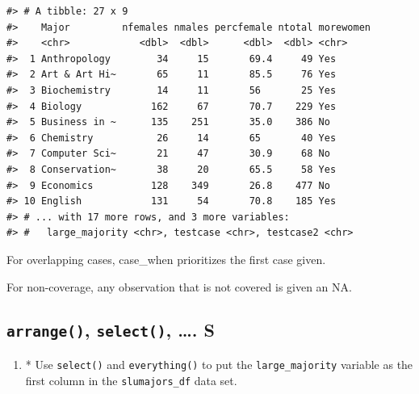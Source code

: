 \documentclass[
]{book}
\providecommand{\tightlist}{%
  \setlength{\itemsep}{0pt}\setlength{\parskip}{0pt}}
\begin{document}
\begin{verbatim}
#> # A tibble: 27 x 9
#>    Major         nfemales nmales percfemale ntotal morewomen
#>    <chr>            <dbl>  <dbl>      <dbl>  <dbl> <chr>    
#>  1 Anthropology        34     15       69.4     49 Yes      
#>  2 Art & Art Hi~       65     11       85.5     76 Yes      
#>  3 Biochemistry        14     11       56       25 Yes      
#>  4 Biology            162     67       70.7    229 Yes      
#>  5 Business in ~      135    251       35.0    386 No       
#>  6 Chemistry           26     14       65       40 Yes      
#>  7 Computer Sci~       21     47       30.9     68 No       
#>  8 Conservation~       38     20       65.5     58 Yes      
#>  9 Economics          128    349       26.8    477 No       
#> 10 English            131     54       70.8    185 Yes      
#> # ... with 17 more rows, and 3 more variables:
#> #   large_majority <chr>, testcase <chr>, testcase2 <chr>
\end{verbatim}

For overlapping cases, case\_when prioritizes the first case given.

For non-coverage, any observation that is not covered is given an NA.

\hypertarget{arrange-select-.-s}{%
\subsection{\texorpdfstring{\texttt{arrange()}, \texttt{select()}, \ldots. S}{arrange(), select(), \ldots. S}}\label{arrange-select-.-s}}

\begin{enumerate}
\def\labelenumi{\arabic{enumi}.}
\setcounter{enumi}{1}
\tightlist
\item
  * Use \texttt{select()} and \texttt{everything()} to put the \texttt{large\_majority} variable as the first column in the \texttt{slumajors\_df} data set.
\end{enumerate}
\end{document}
